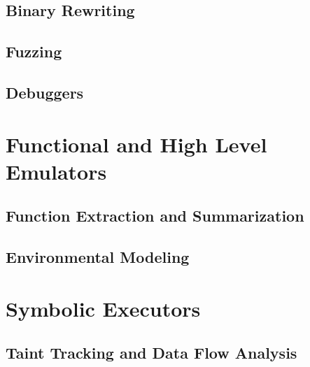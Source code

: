 \subsection{Binary Rewriting}

\subsection{Fuzzing}

\subsection{Debuggers}

\section{Functional and High Level Emulators}

\subsection{Function Extraction and Summarization}

\subsection{Environmental Modeling}

\section{Symbolic Executors}

\subsection{Taint Tracking and Data Flow Analysis}
